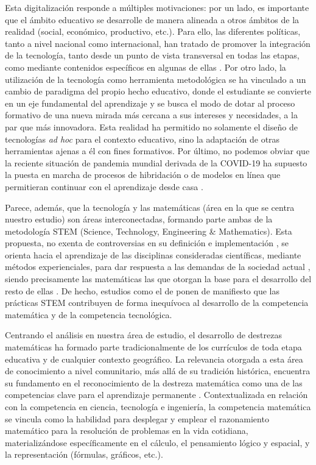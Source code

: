 \documentclass[spanish]{textolivre}
\begin{document}
Esta digitalización responde a múltiples motivaciones: por un lado, es importante que el ámbito educativo se desarrolle de manera alineada a otros ámbitos de la realidad (social, económico, productivo, etc.). Para ello, las diferentes políticas, tanto a nivel nacional como internacional, han tratado de promover la integración de la tecnología, tanto desde un punto de vista transversal en todas las etapas, como mediante contenidos específicos en algunas de ellas \cite{colomo__percepcion_2020}. Por otro lado, la utilización de la tecnología como herramienta metodológica se ha vinculado a un cambio de paradigma del propio hecho educativo, donde el estudiante se convierte en un eje fundamental del aprendizaje y se busca el modo de dotar al proceso formativo de una nueva mirada más cercana a sus intereses y necesidades, a la par que más innovadora. Esta realidad ha permitido no solamente el diseño de tecnologías \textit{ad hoc} para el contexto educativo, sino la adaptación de otras herramientas ajenas a él con fines formativos. Por último, no podemos obviar que la reciente situación de pandemia mundial derivada de la COVID-19 ha supuesto la puesta en marcha de procesos de hibridación o de modelos en línea que permitieran continuar con el aprendizaje desde casa \cite{cuevas__flipped_2020}.

Parece, además, que la tecnología y las matemáticas (área en la que se centra nuestro estudio) son áreas interconectadas, formando parte ambas de la metodología STEM (Science, Technology, Engineering \& Mathematics). Esta propuesta, no exenta de controversias en su definición e implementación \cite{bogdan_stem_2021}, se orienta hacia el aprendizaje de las disciplinas consideradas científicas, mediante métodos experienciales, para dar respuesta a las demandas de la sociedad actual \cite{acar_effects_2018}, siendo precisamente las matemáticas las que otorgan la base para el desarrollo del resto de ellas \cite{maass_role_2019}. De hecho, estudios como el de \textcite{diego-mantecon_steam_2021} ponen de manifiesto que las prácticas STEM contribuyen de forma inequívoca al desarrollo de la competencia matemática y de la competencia tecnológica.

Centrando el análisis en nuestra área de estudio, el desarrollo de destrezas matemáticas ha formado parte tradicionalmente de los currículos de toda etapa educativa y de cualquier contexto geográfico. La relevancia otorgada a esta área de conocimiento a nivel comunitario, más allá de su tradición histórica, encuentra su fundamento en el reconocimiento de la destreza matemática como una de las competencias clave para el aprendizaje permanente \cite{comision_recomendacion_2006,consejo_recomendacion_2018}. Contextualizada en relación con la competencia en ciencia, tecnología e ingeniería, la competencia matemática se vincula como la habilidad para desplegar y emplear el razonamiento matemático para la resolución de problemas en la vida cotidiana, materializándose específicamente en el cálculo, el pensamiento lógico y espacial, y la representación (fórmulas, gráficos, etc.).
\end{document}
